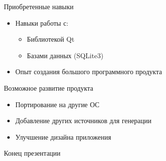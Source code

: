 \begin{frame}{Приобретенные навыки}
    \begin{itemize}[<+->]
        \item Навыки работы с:
        \begin{itemize}
            \item Библиотекой Qt 
            \item Базами данных (SQLite3)
        \end{itemize}
        \item Опыт создания большого программного продукта
    \end{itemize}
\end{frame}

\begin{frame}{Возможное развитие продукта}
    \begin{itemize}[<+->]
        \item Портирование на другие ОС
        \item Добавление других источников для генерации
        \item Улучшение дизайна приложения
    \end{itemize}
\end{frame}

\begin{frame}{Конец презентации}
\end{frame}
